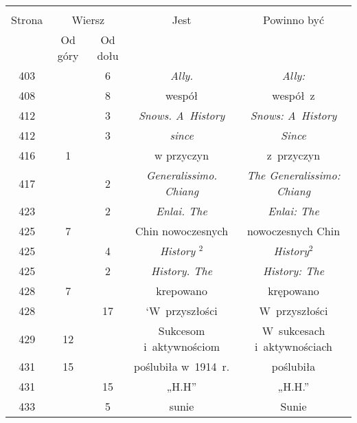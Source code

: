 \documentclass[a4paper,11pt]{article}
\begin{document}
\begin{center}
  \begin{tabular}{|c|c|c|c|c|}
    \hline
    & \multicolumn{2}{c|}{} & & \\
    Strona & \multicolumn{2}{c|}{Wiersz} & Jest
    & Powinno być \\ \cline{2-3}
    & Od góry & Od dołu & & \\
    \hline
    403 & &  6 & \textit{Ally.} & \textit{Ally:} \\
    408 & &  8 & wespół & wespół~z \\
    412 & &  3 & \textit{Snows. A~History} & \textit{Snows: A~History} \\
    412 & &  3 & \textit{since} & \textit{Since} \\
    416 &  1 & & w przyczyn & z~przyczyn \\
    417 & &  2 & \textit{Generalissimo. Chiang}
           & \textit{The Generalissimo: Chiang} \\
    423 & &  2 & \textit{Enlai. The} & \textit{Enlai: The} \\
    425 &  7 & & Chin nowoczesnych & nowoczesnych Chin \\
    425 & &  4 & \textit{History} $^{ 2 }$ & \textit{History}$^{ 2 }$ \\
    425 & &  2 & \textit{History. The} & \textit{History: The} \\
    428 &  7 & & krepowano & krępowano \\
    428 & & 17 & `W~przyszłości & W~przyszłości \\
    429 & 12 & & Sukcesom i~aktywnościom & W~sukcesach i~aktywnościach \\
    431 & 15 & & poślubiła w~1914~r. & poślubiła \\
    431 & & 15 & „H.H” & „H.H.” \\
    433 & &  5 & sunie & Sunie \\

\end{tabular}
\end{center}
\end{document}
